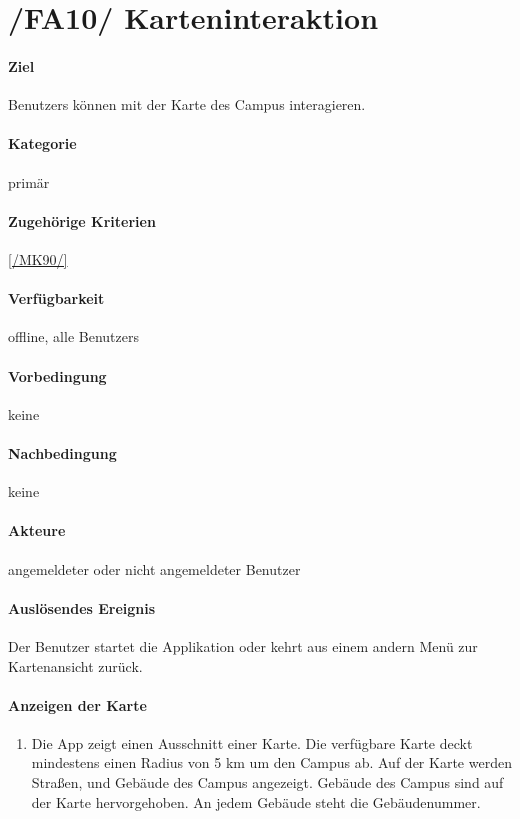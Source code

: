 \section[Karteninteraktion]{/FA10/ Karteninteraktion}
\label{/FA10/}
\paragraph{Ziel}
\Glspl{Benutzer} können mit der \Gls{Karte} des \Gls{Campus} interagieren.
\paragraph{Kategorie}
primär
\paragraph{Zugehörige Kriterien}
\ref{/MK90/} 
\paragraph{Verfügbarkeit}
\gls{offline}, alle \Glspl{Benutzer}
\paragraph{Vorbedingung}
keine
\paragraph{Nachbedingung}
keine
\paragraph{Akteure}
angemeldeter oder nicht angemeldeter \Gls{Benutzer}
\paragraph{Auslösendes Ereignis}
Der \Gls{Benutzer} startet die Applikation oder kehrt aus einem andern Menü zur \Gls{Kartenansicht} zurück.
\paragraph{Anzeigen der Karte}
\begin{enumerate}[start=11, label=\textbf{/FA\arabic*/}, align=left]
    \item Die App zeigt einen Ausschnitt einer \Gls{Karte}. Die verfügbare \Gls{Karte} deckt mindestens einen Radius von 5 km um den \Gls{Campus} ab. Auf der \Gls{Karte} werden Straßen, und Gebäude des \Gls{Campus} angezeigt. Gebäude des \Gls{Campus} sind auf der \Gls{Karte} hervorgehoben. An jedem Gebäude steht die Gebäudenummer.
\end{enumerate}
